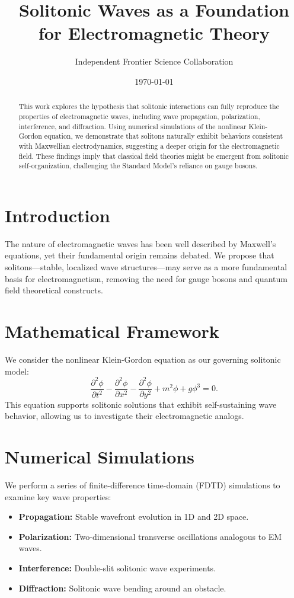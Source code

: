\documentclass{article}
\title{Solitonic Waves as a Foundation for Electromagnetic Theory}
\author{Independent Frontier Science Collaboration}
\date{\today}
\begin{document}
\maketitle

\begin{abstract}
This work explores the hypothesis that solitonic interactions can fully reproduce the properties of electromagnetic waves, including wave propagation, polarization, interference, and diffraction. Using numerical simulations of the nonlinear Klein-Gordon equation, we demonstrate that solitons naturally exhibit behaviors consistent with Maxwellian electrodynamics, suggesting a deeper origin for the electromagnetic field. These findings imply that classical field theories might be emergent from solitonic self-organization, challenging the Standard Model’s reliance on gauge bosons.
\end{abstract}

\section{Introduction}
The nature of electromagnetic waves has been well described by Maxwell’s equations, yet their fundamental origin remains debated. We propose that solitons—stable, localized wave structures—may serve as a more fundamental basis for electromagnetism, removing the need for gauge bosons and quantum field theoretical constructs.

\section{Mathematical Framework}
We consider the nonlinear Klein-Gordon equation as our governing solitonic model:
\begin{equation}
\frac{\partial^2 \phi}{\partial t^2} - \frac{\partial^2 \phi}{\partial x^2} - \frac{\partial^2 \phi}{\partial y^2} + m^2 \phi + g \phi^3 = 0.
\end{equation}
This equation supports solitonic solutions that exhibit self-sustaining wave behavior, allowing us to investigate their electromagnetic analogs.

\section{Numerical Simulations}
We perform a series of finite-difference time-domain (FDTD) simulations to examine key wave properties:
\begin{itemize}
    \item \textbf{Propagation:} Stable wavefront evolution in 1D and 2D space.
    \item \textbf{Polarization:} Two-dimensional transverse oscillations analogous to EM waves.
    \item \textbf{Interference:} Double-slit solitonic wave experiments.
    \item \textbf{Diffraction:} Solitonic wave bending around an obstacle.
\end{itemize}
\end{document}
